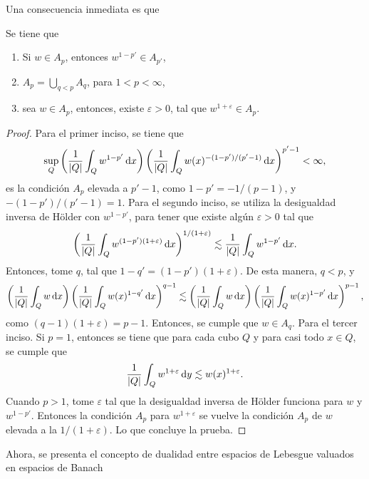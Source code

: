 Una consecuencia inmediata es que 
\begin{corollary}\label{cor:inverse-Holder}
	Se tiene que 
	\begin{enumerate}
		\item Si $w\in A_p$, entonces $w^{1-p'}\in A_{p'}$,
		\item $A_p = \bigcup_{q<p}A_q$, para $1<p<\infty$,
		\item sea $w\in A_p$, entonces, existe $\varepsilon>0$, tal que $w^{1+\varepsilon}\in A_p$.
	\end{enumerate}
\end{corollary}
\begin{proof}
	Para el primer inciso, se tiene que 
	\begin{equation*}
		\sup_Q\left(\frac{1}{|Q|}\int_Q w^{1-p'}\mathop{}\!\mathrm{d} x \right)\left(\frac{1}{|Q|}\int_Q w(x)^{-(1-p')/(p'-1)}\mathop{}\!\mathrm{d} x\right)^{p'-1} < \infty,
	\end{equation*}
	es la condición $A_p$ elevada a $p'-1$, como $1-p' = -1/(p-1)$, y $-(1-p')/(p'-1) = 1$. Para el segundo inciso, se utiliza la desigualdad inversa de Hölder con $w^{1-p'}$, para tener que existe algún $\varepsilon>0$ tal que
	\begin{equation*}
		\left(\frac{1}{|Q|}\int_Q w^{(1-p')(1+\varepsilon)}\mathop{}\!\mathrm{d} x\right)^{1/(1+\varepsilon)} \lesssim \frac{1}{|Q|}\int_Q w^{1-p'}\mathop{}\!\mathrm{d} x.
	\end{equation*}
	Entonces, tome $q$, tal que $1-q' = (1-p')(1+\varepsilon)$. De esta manera, $q<p$, y
	\begin{equation*}
		\left(\frac{1}{|Q|}\int_Q w \mathop{}\!\mathrm{d} x \right)\left(\frac{1}{|Q|}\int_Q w(x)^{1-q'}\mathop{}\!\mathrm{d} x\right)^{q-1}  \lesssim \left(\frac{1}{|Q|}\int_Q w \mathop{}\!\mathrm{d} x \right)\left(\frac{1}{|Q|}\int_Q w(x)^{1-p'}\mathop{}\!\mathrm{d} x\right)^{p-1},
	\end{equation*}
	como $(q-1)(1+\varepsilon) = p-1$. Entonces, se cumple que $w\in A_q$. Para el tercer inciso. Si $p=1$, entonces se tiene que para cada cubo $Q$ y para casi todo $x\in Q$, se cumple que 
	\begin{equation*}
		\frac{1}{|Q|}\int_Q w^{1+\varepsilon}\mathop{}\!\mathrm{d} y \lesssim w(x)^{1+\varepsilon}.
	\end{equation*}
	Cuando $p>1$, tome $\varepsilon$ tal que la desigualdad inversa de Hölder funciona para $w$ y  $w^{1-p'}$.  Entonces la condición $A_p$ para $w^{1+\varepsilon}$ se vuelve la condición $A_p$ de $w$ elevada a la $1/(1+\varepsilon)$. Lo que concluye la prueba. 
\end{proof}
Ahora, se presenta el concepto de dualidad entre espacios de Lebesgue valuados en espacios de Banach
